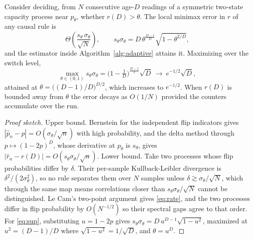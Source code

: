 \begin{lemma}\label{thm:adapt}
Consider deciding, from $N$ consecutive age-$D$ readings of a symmetric two-state
capacity process near $p_\theta$, whether $r(D)>\theta$. The local minimax error in
$r$ of any causal rule is
\begin{equation}\label{eq:rate}
\Theta\!\left(\frac{s_\theta\,\sigma_\theta}{\sqrt N}\right),
\qquad
s_\theta\sigma_\theta=D\,\theta^{\frac{D-1}{D}}\sqrt{1-\theta^{2/D}},
\end{equation}
and the estimator inside Algorithm~\ref{alg:adaptive} attains it. Maximizing over
the switch level,
\begin{equation}\label{eq:sup}
\max_{\theta\in(0,1)} s_\theta\sigma_\theta
=\Big(1-\tfrac1D\Big)^{\frac{D-1}{2}}\sqrt D\ \longrightarrow\ e^{-1/2}\sqrt D,
\end{equation}
attained at $\theta=\big((D-1)/D\big)^{D/2}$, which increases to $e^{-1/2}$. When
$r(D)$ is bounded away from $\theta$ the error decays as $O(1/N)$ provided the
counters accumulate over the run.
\end{lemma}
\begin{proof}[Proof sketch]
Upper bound. Bernstein for the independent flip indicators \cite{paulin2015} gives
$|\hat p_n-p|=O(\sigma_\theta/\sqrt n)$ with high probability, and the delta method
through $p\mapsto(1-2p)^D$, whose derivative at $p_\theta$ is $s_\theta$, gives
$|\hat r_n-r(D)|=O(s_\theta\sigma_\theta/\sqrt n)$. Lower bound. Take two processes
whose flip probabilities differ by $\delta$. Their per-sample Kullback-Leibler
divergence is $\delta^2/(2\sigma_\theta^2)$, so no rule separates them over $N$
samples unless $\delta\gtrsim\sigma_\theta/\sqrt N$, which through the same map
means correlations closer than $s_\theta\sigma_\theta/\sqrt N$ cannot be
distinguished. Le Cam's two-point argument \cite{tsybakov} gives \eqref{eq:rate},
and the two processes differ in flip probability by $O(N^{-1/2})$ so their spectral
gaps agree to that order. For \eqref{eq:sup}, substituting $u=1-2p$ gives
$s_\theta\sigma_\theta=D\,u^{D-1}\sqrt{1-u^2}$, maximized at $u^2=(D-1)/D$ where
$\sqrt{1-u^2}=1/\sqrt D$, and $\theta=u^D$.
\end{proof}

